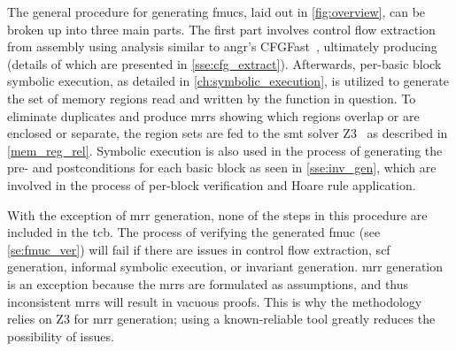 The general procedure for generating \acp{fmuc}, laid out in \cref{fig:overview},
can be broken up into three main parts.
The first part involves control flow extraction from assembly using  analysis
similar to angr's CFGFast~\citep{shoshitaishvili2016state},%
ultimately producing  (details of which are presented
in \cref{sse:cfg_extract}).
Afterwards, per-basic block symbolic execution,%
%
as detailed in \cref{ch:symbolic_execution},
is utilized to generate the set of memory regions%
read and written by the function in question.
To eliminate duplicates and produce \acp{mrr}
showing which regions overlap or are enclosed or separate,%
%
the region sets are fed to the \ac{smt} solver Z3~\citep{de2008z3}
as described in \cref{mem_reg_rel}.
Symbolic execution is also used in the process of generating%
the pre- and postconditions for each basic block as seen in \cref{sse:inv_gen},%
%
which are involved in the process of per-block verification
and Hoare rule application.%

With the exception of \ac{mrr} generation,
none of the steps in this procedure are included in the \ac{tcb}.
The process of verifying the generated \ac{fmuc} (see \cref{se:fmuc_ver})
will fail if there are issues in control flow extraction,
\ac{scf} generation, informal symbolic execution, or invariant generation.
\Ac{mrr} generation is an exception
because the \acp{mrr} are formulated as assumptions,
and thus inconsistent \acp{mrr} will result in vacuous proofs.
This is why the methodology relies on Z3 for \ac{mrr} generation;%
using a known-reliable tool greatly reduces the possibility of issues.

